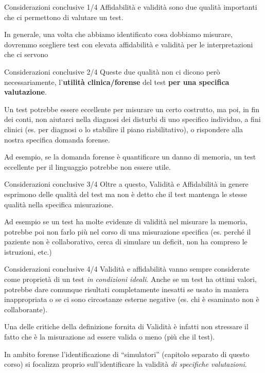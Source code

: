 \documentclass[
  ignorenonframetext,
]{beamer}
\begin{document}
\begin{frame}{Considerazioni conclusive 1/4}
\label{considerazioni-conclusive-14}
Affidabilità e validità sono due qualità importanti che ci permettono di
valutare un test.

In generale, una volta che abbiamo identificato cosa dobbiamo misurare,
dovremmo scegliere test con elevata affidabilità e validità per le
interpretazioni che ci servono
\end{frame}

\begin{frame}{Considerazioni conclusive 2/4}
\label{considerazioni-conclusive-24}
Queste due qualità non ci dicono però necessariamente, l'\textbf{utilità
clinica/forense} del test \textbf{per una specifica valutazione}.

Un test potrebbe essere eccellente per misurare un certo costrutto, ma
poi, in fin dei conti, non aiutarci nella diagnosi dei disturbi di uno
specifico individuo, a fini clinici (es. per diagnosi o lo stabilire il
piano riabilitativo), o rispondere alla nostra specifica domanda
forense.

Ad esempio, se la domanda forense è quantificare un danno di memoria, un
test eccellente per il linguaggio potrebbe non essere utile.
\end{frame}

\begin{frame}{Considerazioni conclusive 3/4}
\label{considerazioni-conclusive-34}
Oltre a questo, Validità e Affidabilità in genere esprimono delle
qualità del test ma non è detto che il test mantenga le stesse qualità
nella specifica misurazione.

Ad esempio se un test ha molte evidenze di validità nel misurare la
memoria, potrebbe poi non farlo più nel corso di una misurazione
specifica (es. perché il paziente non è collaborativo, cerca di simulare
un deficit, non ha compreso le istruzioni, etc.)
\end{frame}

\begin{frame}{Considerazioni conclusive 4/4}
\label{considerazioni-conclusive-44}
Validità e affidabilità vanno sempre considerate come proprietà di un
test \emph{in condizioni ideali}. Anche se un test ha ottimi valori,
potrebbe dare comunque risultati completamente inesatti se usato in
maniera inappropriata o se ci sono circostanze esterne negative (es. chi
è esaminato non è collaborante).

Una delle critiche della definizione fornita di Validità è infatti non
stressare il fatto che è la misurazione ad essere valida o meno (più che
il test).

In ambito forense l'identificazione di ``simulatori'' (capitolo separato
di questo corso) si focalizza proprio sull'identificare la validità
\emph{di specifiche valutazioni}.
\end{frame}
\end{document}
